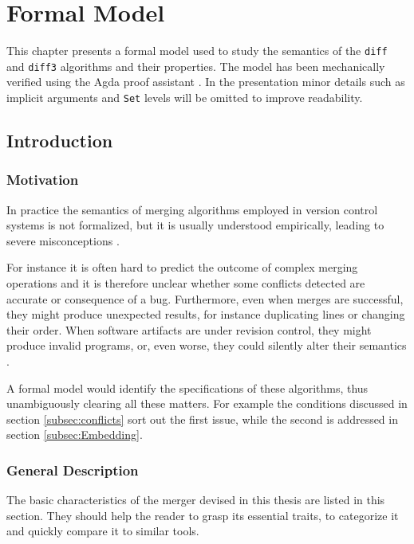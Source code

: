 \documentclass[../Thesis.tex]{subfiles}
\begin{document}
\chapter{Formal Model}
\label{chapter:FormalModel}
This chapter presents a formal model used to study the semantics of the \texttt{diff} and \texttt{diff3} algorithms and their properties.
The model has been mechanically verified using the Agda proof assistant
\cite{Bove09, NorellPhd, Norell08}.
In the presentation minor details such as implicit arguments and \texttt{Set} levels will be omitted to improve readability. 	

\section{Introduction}

	\subsection{Motivation}
	In practice the semantics of merging algorithms employed in version control 
	systems is not formalized, but it is usually understood empirically,
	leading to severe misconceptions \cite{PierceDiff3}.
	
	For instance it is often hard to predict the outcome of complex merging 	
	operations and it is therefore unclear whether some conflicts detected are 	
	accurate or consequence of a bug. 
	Furthermore, even when merges are successful, they might produce 
	unexpected	results, for instance duplicating lines or changing their order.
	When software artifacts are under revision control, they might produce 
	invalid programs, or, even worse, they could silently alter 
	their semantics \cite{Mens02}.

	A formal model would identify the specifications of these algorithms,
	thus unambiguously clearing all these matters.
	For example the conditions discussed in section \ref{subsec:conflicts}
	sort out the first issue, while the second is addressed in section 
	\ref{subsec:Embedding}.

	\subsection{General Description}
	The basic characteristics of the merger devised in this thesis
	are listed in this section. They should help the reader to grasp
	its essential traits, to categorize it and quickly compare it to similar tools.
	
\end{document}
